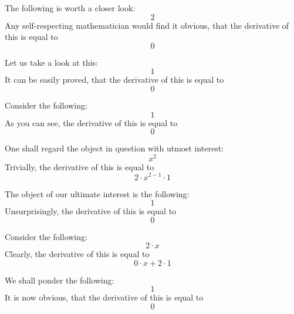 \documentclass{article}
\begin{document}
The following is worth a closer look:
\begin{equation}
2 
\end{equation}
Any self-respecting mathematician would find it obvious, that the derivative of this is equal to
\begin{equation}
0 
\end{equation}

Let us take a look at this:
\begin{equation}
1 
\end{equation}
It can be easily proved, that the derivative of this is equal to
\begin{equation}
0 
\end{equation}

Consider the following:
\begin{equation}
1 
\end{equation}
As you can see, the derivative of this is equal to
\begin{equation}
0 
\end{equation}

One shall regard the object in question with utmost interest:
\begin{equation}
x ^{2 } 
\end{equation}
Trivially, the derivative of this is equal to
\begin{equation}
2 \cdot x ^{2 - 1 } \cdot 1 
\end{equation}

The object of our ultimate interest is the following:
\begin{equation}
1 
\end{equation}
Unsurprisingly, the derivative of this is equal to
\begin{equation}
0 
\end{equation}

Consider the following:
\begin{equation}
2 \cdot x 
\end{equation}
Clearly, the derivative of this is equal to
\begin{equation}
0 \cdot x + 2 \cdot 1 
\end{equation}

We shall ponder the following:
\begin{equation}
1 
\end{equation}
It is now obvious, that the derivative of this is equal to
\begin{equation}
0 
\end{equation}
\end{document}

